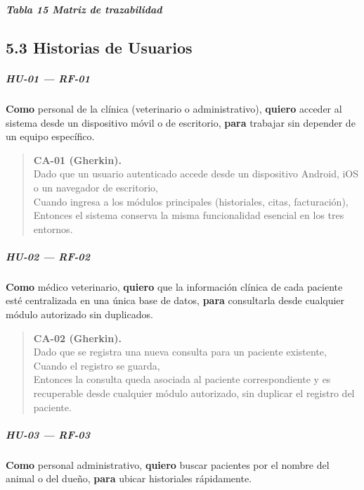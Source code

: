 \documentclass[
]{article}
\begin{document}
\protect{}\label{_bookmark66}{}\emph{\textbf{Tabla 15
Matriz de trazabilidad}}

\subsection{5.3 Historias de Usuarios} \label{historias-de-usuario}
\subparagraph{HU-01 --- RF-01}
\textbf{Como} personal de la clínica (veterinario o administrativo),
\textbf{quiero} acceder al sistema desde un dispositivo móvil o de escritorio,
\textbf{para} trabajar sin depender de un equipo específico.

\begin{quote}
\textbf{CA-01 (Gherkin).} \\
Dado que un usuario autenticado accede desde un dispositivo Android, iOS o un navegador de escritorio, \\
Cuando ingresa a los módulos principales (historiales, citas, facturación), \\
Entonces el sistema conserva la misma funcionalidad esencial en los tres entornos.
\end{quote}

\subparagraph{HU-02 --- RF-02}
\textbf{Como} médico veterinario,
\textbf{quiero} que la información clínica de cada paciente esté centralizada en una única base de datos,
\textbf{para} consultarla desde cualquier módulo autorizado sin duplicados.

\begin{quote}
\textbf{CA-02 (Gherkin).} \\
Dado que se registra una nueva consulta para un paciente existente, \\
Cuando el registro se guarda, \\
Entonces la consulta queda asociada al paciente correspondiente y es recuperable desde cualquier módulo autorizado, sin duplicar el registro del paciente.
\end{quote}

\subparagraph{HU-03 --- RF-03}
\textbf{Como} personal administrativo,
\textbf{quiero} buscar pacientes por el nombre del animal o del dueño,
\textbf{para} ubicar historiales rápidamente.
\end{document}
